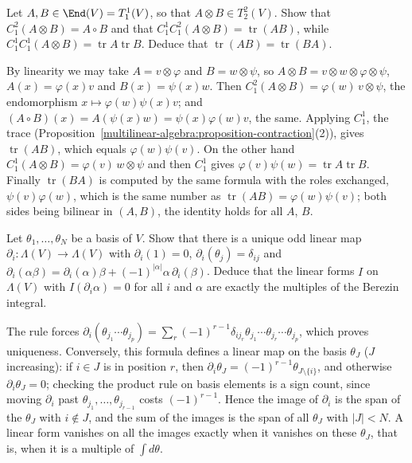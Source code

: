 \begin{exercise}\label{multilinear-algebra:exercise-contraction-composition}
Let $A, B \in \End(V) = T^1_1(V)$, so that $A \otimes B \in T^2_2(V)$. Show that $C^2_1(A \otimes B) = A \circ B$ and that $C^1_1C^2_1(A \otimes B) = \operatorname{tr}(AB)$, while
$C^1_1C^1_1(A \otimes B) = \operatorname{tr}A\operatorname{tr}B$. Deduce that $\operatorname{tr}(AB) = \operatorname{tr}(BA)$.
\end{exercise}

\begin{solution}
By linearity we may take $A = v \otimes \varphi$ and $B = w \otimes \psi$, so $A \otimes B = v \otimes w \otimes \varphi \otimes \psi$, $A(x) = \varphi(x)v$ and $B(x) = \psi(x)w$. Then
$C^2_1(A \otimes B) = \varphi(w)\,v \otimes \psi$, the endomorphism $x \mapsto \varphi(w)\psi(x)v$; and $(A \circ B)(x) = A(\psi(x)w) = \psi(x)\varphi(w)v$, the same. Applying $C^1_1$, the trace
(Proposition~\ref{multilinear-algebra:proposition-contraction}(2)), gives $\operatorname{tr}(AB)$, which equals $\varphi(w)\psi(v)$. On the other hand $C^1_1(A \otimes B) = \varphi(v)\,w \otimes \psi$
and then $C^1_1$ gives $\varphi(v)\psi(w) = \operatorname{tr}A\operatorname{tr}B$. Finally $\operatorname{tr}(BA)$ is computed by the same formula with the roles exchanged, $\psi(v)\varphi(w)$,
which is the same number as $\operatorname{tr}(AB) = \varphi(w)\psi(v)$; both sides being bilinear in $(A, B)$, the identity holds for all $A$, $B$.
\end{solution}

\begin{exercise}\label{multilinear-algebra:exercise-berezin-unique}
Let $\theta_1, \ldots, \theta_N$ be a basis of $V$. Show that there is a unique odd linear map $\partial_i \colon \Lambda(V) \to \Lambda(V)$ with $\partial_i(1) = 0$, $\partial_i(\theta_j) = \delta_{ij}$ and
$\partial_i(\alpha\beta) = \partial_i(\alpha)\beta + (-1)^{|\alpha|}\alpha\,\partial_i(\beta)$. Deduce that the linear forms $I$ on $\Lambda(V)$ with $I(\partial_i\alpha) = 0$ for all $i$ and $\alpha$ are exactly the multiples of the
Berezin integral.
\end{exercise}

\begin{solution}
The rule forces $\partial_i(\theta_{j_1} \cdots \theta_{j_p}) = \sum_r(-1)^{r-1}\delta_{ij_r}\theta_{j_1} \cdots \widehat{\theta_{j_r}} \cdots \theta_{j_p}$, which proves uniqueness. Conversely, this formula defines a linear map
on the basis $\theta_J$ ($J$ increasing): if $i \in J$ is in position $r$, then $\partial_i\theta_J = (-1)^{r-1}\theta_{J \setminus \{i\}}$, and otherwise $\partial_i\theta_J = 0$; checking the product rule on basis elements
is a sign count, since moving $\partial_i$ past $\theta_{j_1}, \ldots, \theta_{j_{r-1}}$ costs $(-1)^{r-1}$. Hence the image of $\partial_i$ is the span of the $\theta_J$ with $i \notin J$, and the sum of the images is
the span of all $\theta_J$ with $|J| < N$. A linear form vanishes on all the images exactly when it vanishes on these $\theta_J$, that is, when it is a multiple of $\int d\theta$.
\end{solution}

